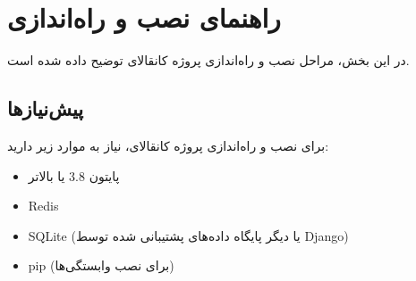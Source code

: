 \documentclass[letterpaper,10pt,english]{sphinxmanual}
\begin{document}
\section{راهنمای نصب و راه‌اندازی}
\label{\detokenize{installation/index:installation}}\label{\detokenize{installation/index:id1}}\label{\detokenize{installation/index::doc}}
\sphinxAtStartPar
در این بخش، مراحل نصب و راه‌اندازی پروژه کانقالای توضیح داده شده است.


\subsection{پیش‌نیازها}
\label{\detokenize{installation/index:id2}}
\sphinxAtStartPar
برای نصب و راه‌اندازی پروژه کانقالای، نیاز به موارد زیر دارید:
\begin{itemize}
\item {} 
\sphinxAtStartPar
پایتون 3.8 یا بالاتر

\item {} 
\sphinxAtStartPar
Redis

\item {} 
\sphinxAtStartPar
SQLite (یا دیگر پایگاه داده‌های پشتیبانی شده توسط Django)

\item {} 
\sphinxAtStartPar
pip (برای نصب وابستگی‌ها)

\end{itemize}
\end{document}
